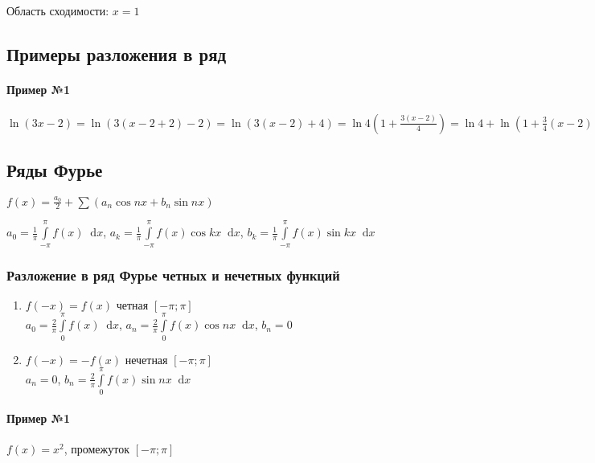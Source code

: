\documentclass{article}
\newcommand*\diff{\mathop{}\!\mathrm{d}}
\begin{document}
Область сходимости: $x = 1$

\subsection{Примеры разложения в ряд}

\paragraph{Пример №1}

$\ln (3 x - 2) = \ln (3 (x - 2 + 2) - 2) = \ln (3 (x - 2) + 4) = \ln 4 (1 + \frac{3 ( x - 2)}{4}) = \ln 4 + \ln (1 + \frac{3}{4}(x - 2)) = \ln 4 + \frac{3}{4} (x - 2) - \frac{1}{2} (\frac{3}{4} (x - 2))^2 + \frac{1}{3} (\frac{3}{4} (x - 2))^3 - \dots$

\subsection{Ряды Фурье}

$f(x) = \frac{a_0}{2} + \sum (a_{n} \cos n x + b_{n} \sin n x)$

$a_0 = \frac{1}{\pi} \int\limits_{-\pi}^{\pi} f(x) \diff x$, $a_{k} = \frac{1}{\pi} \int\limits_{-\pi}^{\pi} f(x) \cos k x \diff x$, $b_{k} = \frac{1}{\pi} \int\limits_{-\pi}^{\pi} f(x) \sin k x \diff x$

\subsubsection{Разложение в ряд Фурье четных и нечетных функций}

\begin{enumerate}
    \item $f(-x) = f(x)$ четная $[-\pi; \pi]$ \\
    $a_0 = \frac{2}{\pi} \int\limits_{0}^{\pi} f(x) \diff x$, $a_{n} = \frac{2}{\pi} \int\limits_{0}^{\pi} f(x) \cos n x \diff x$, $b_{n} = 0$
    \item $f(-x) = - f(x)$ нечетная $[-\pi; \pi]$ \\
    $a_{n} = 0$, $b_{n} = \frac{2}{\pi} \int\limits_{0}^{\pi} f(x) \sin n x \diff x$
\end{enumerate}

\paragraph{Пример №1}

$f(x) = x^2$, промежуток $[-\pi; \pi]$
\end{document}
